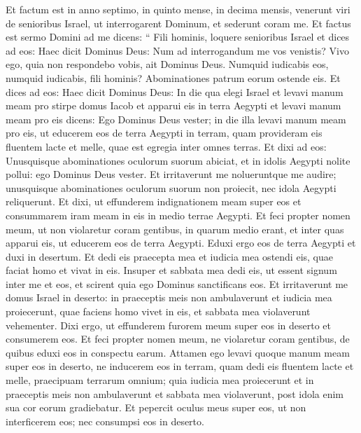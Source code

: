 \begin{biblechapter}
\begin{biblechapter}
\begin{biblechapter}
\begin{biblechapter}
\begin{biblechapter}
\begin{biblechapter}
\begin{biblechapter}
\begin{biblechapter}
\begin{biblechapter}
\begin{biblechapter}
\begin{biblechapter}
\begin{biblechapter}
\begin{biblechapter}
\begin{biblechapter}
\begin{biblechapter}
\begin{biblechapter}
\begin{biblechapter}
\begin{biblechapter}
\begin{biblechapter}
\begin{biblechapter}
\verse Et factum est in anno septimo, in quinto mense, in decima mensis, venerunt viri de senioribus Israel, ut interrogarent Dominum, et sederunt coram me. 
\verse Et factus est sermo Domini ad me dicens: 
\verse “ Fili hominis, loquere senioribus Israel et dices ad eos: Haec dicit Dominus Deus: Num ad interrogandum me vos venistis? Vivo ego, quia non respondebo vobis, ait Dominus Deus. 
\verse Numquid iudicabis eos, numquid iudicabis, fili hominis? Abominationes patrum eorum ostende eis.
 \verse Et dices ad eos: Haec dicit Dominus Deus: In die qua elegi Israel et levavi manum meam pro stirpe domus Iacob et apparui eis in terra Aegypti et levavi manum meam pro eis dicens: Ego Dominus Deus vester; 
\verse in die illa levavi manum meam pro eis, ut educerem eos de terra Aegypti in terram, quam provideram eis fluentem lacte et melle, quae est egregia inter omnes terras. 
\verse Et dixi ad eos: Unusquisque abominationes oculorum suorum abiciat, et in idolis Aegypti nolite pollui: ego Dominus Deus vester. 
\verse Et irritaverunt me nolueruntque me audire; unusquisque abominationes oculorum suorum non proiecit, nec idola Aegypti reliquerunt. Et dixi, ut effunderem indignationem meam super eos et consummarem iram meam in eis in medio terrae Aegypti. 
\verse Et feci propter nomen meum, ut non violaretur coram gentibus, in quarum medio erant, et inter quas apparui eis, ut educerem eos de terra Aegypti.
 \verse Eduxi ergo eos de terra Aegypti et duxi in desertum. 
\verse Et dedi eis praecepta mea et iudicia mea ostendi eis, quae faciat homo et vivat in eis.
 \verse Insuper et sabbata mea dedi eis, ut essent signum inter me et eos, et scirent quia ego Dominus sanctificans eos. 
\verse Et irritaverunt me domus Israel in deserto: in praeceptis meis non ambulaverunt et iudicia mea proiecerunt, quae faciens homo vivet in eis, et sabbata mea violaverunt vehementer. Dixi ergo, ut effunderem furorem meum super eos in deserto et consumerem eos. 
\verse Et feci propter nomen meum, ne violaretur coram gentibus, de quibus eduxi eos in conspectu earum. 
\verse Attamen ego levavi quoque manum meam super eos in deserto, ne inducerem eos in terram, quam dedi eis fluentem lacte et melle, praecipuam terrarum omnium; 
\verse quia iudicia mea proiecerunt et in praeceptis meis non ambulaverunt et sabbata mea violaverunt, post idola enim sua cor eorum gradiebatur. 
\verse Et pepercit oculus meus super eos, ut non interficerem eos; nec consumpsi eos in deserto.

\end{biblechapter}
\end{biblechapter}
\end{biblechapter}
\end{biblechapter}
\end{biblechapter}
\end{biblechapter}
\end{biblechapter}
\end{biblechapter}
\end{biblechapter}
\end{biblechapter}
\end{biblechapter}
\end{biblechapter}
\end{biblechapter}
\end{biblechapter}
\end{biblechapter}
\end{biblechapter}
\end{biblechapter}
\end{biblechapter}
\end{biblechapter}
\end{biblechapter}
